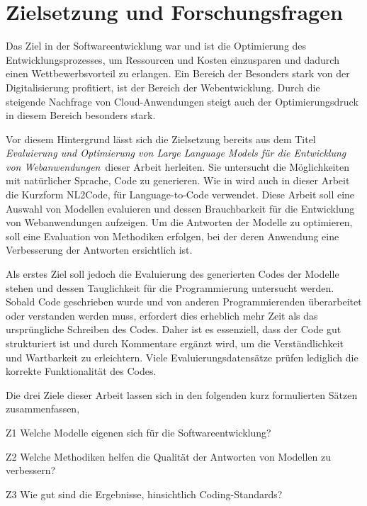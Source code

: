 

\section{Zielsetzung und Forschungsfragen}
Das Ziel in der Softwareentwicklung war und ist die Optimierung des Entwicklungsprozesses, um Ressourcen und Kosten einzusparen und dadurch einen Wettbewerbsvorteil zu erlangen. Ein Bereich der Besonders stark von der Digitalisierung profitiert, ist der Bereich der Webentwicklung. Durch die steigende Nachfrage von Cloud-Anwendungen steigt auch der Optimierungsdruck in diesem Bereich besonders stark.\vspace{0.2cm}

Vor diesem Hintergrund lässt sich die Zielsetzung bereits aus dem Titel \glqq \textit{Evaluierung und Optimierung von Large Language Models für die Entwicklung von Webanwendungen}\grqq \ dieser Arbeit herleiten. Sie untersucht die Möglichkeiten mit natürlicher Sprache, Code zu generieren. Wie in \cite[vgl. Seite 2]{jiang-2024} wird auch in dieser Arbeit die Kurzform NL2Code, für Language-to-Code verwendet. Diese Arbeit soll eine Auswahl von Modellen evaluieren und dessen Brauchbarkeit für die Entwicklung von Webanwendungen aufzeigen. Um die Antworten der Modelle zu optimieren, soll eine Evaluation von Methodiken erfolgen, bei der deren Anwendung eine Verbesserung der Antworten ersichtlich ist.\vspace{0.2cm}

Als erstes Ziel soll jedoch die Evaluierung des generierten Codes der Modelle stehen und dessen Tauglichkeit für die Programmierung untersucht werden. Sobald Code geschrieben wurde und von anderen Programmierenden überarbeitet oder verstanden werden muss, erfordert dies erheblich mehr Zeit als das ursprüngliche Schreiben des Codes. Daher ist es essenziell, dass der Code gut strukturiert ist und durch Kommentare ergänzt wird, um die Verständlichkeit und Wartbarkeit zu erleichtern. Viele Evaluierungsdatensätze prüfen lediglich die korrekte Funktionalität des Codes.\vspace{0.2cm}

Die drei Ziele dieser Arbeit lassen sich in den folgenden kurz formulierten Sätzen zusammenfassen,

\begin{myitemize}
	\item[Z1] Welche Modelle eigenen sich für die Softwareentwicklung?
	\item[Z2] Welche Methodiken helfen die Qualität der Antworten von Modellen zu verbessern?
	\item[Z3] Wie gut sind die Ergebnisse, hinsichtlich Coding-Standards?
\end{myitemize}

